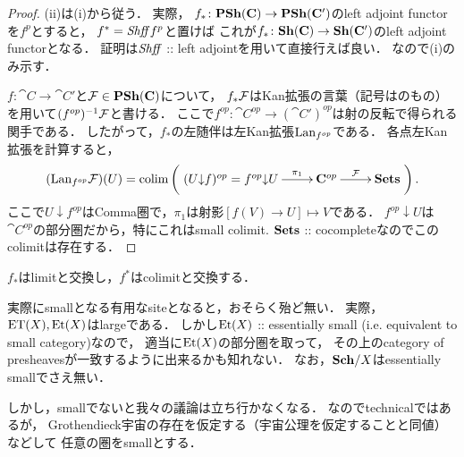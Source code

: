 \documentclass[a4paper]{jsarticle}
\begin{document}
\begin{proof}
    (ii)は(i)から従う．
    実際，
    $f_* \colon \mathbf{PSh}(\mathbf{C}) \to \mathbf{PSh}(\mathbf{C}')$のleft adjoint functorを$f^p$とすると，
    $f^*=\mathit{Shff} f^p$と置けば
    これが$f_* \colon \mathbf{Sh}(\mathbf{C}) \to \mathbf{Sh}(\mathbf{C}')$のleft adjoint functorとなる．
    証明は$\mathit{Shff}$ :: left adjointを用いて直接行えば良い．
    なので(i)のみ示す．

    $f \colon \cat{C} \to \cat{C}'$と$\mathcal{F} \in \mathbf{PSh}(\mathbf{C})$について，
    $f_* \mathcal{F}$はKan拡張の言葉（記号は\cite{CWM}のもの）を用いて$(f^{op})^{-1} \mathcal{F}$と書ける．
    ここで$f^{op} \colon \cat{C}^{op} \to (\cat{C}')^{op}$は射の反転で得られる関手である．
    したがって，$f_*$の左随伴は左Kan拡張$\mathrm{Lan}_{f^{op}}$である．
    各点左Kan拡張を計算すると，
    \[ (\Lan_{f^{op}}\shF)(U)=\Colim\left(\xymatrix{
        (\Comma{U}{f})^{op}=\Comma{f^{op}}{U} \ar[r]^-{\pi_1}& \cat{C}^{op} \ar[r]^-{\shF}& \Sets
    }\right). \]
    ここで$U \downarrow f^{op}$はComma圏で，$\pi_1$は射影$[f(V) \to U] \mapsto V$である．
    $f^{op} \downarrow U$は$\cat{C}^{op}$の部分圏だから，特にこれはsmall colimit.
    $\mathbf{Sets}$ :: cocompleteなのでこのcolimitは存在する．
\end{proof}

\begin{Cor}
    $f_*$はlimitと交換し，$f^*$はcolimitと交換する．
\end{Cor}


\begin{Remark}
    実際にsmallとなる有用なsiteとなると，おそらく殆ど無い．
    実際，$\mathrm{ET}(X), \mathrm{Et}(X)$はlargeである．
    しかし$\mathrm{Et}(X)$ :: essentially small (i.e. equivalent to small category)なので，
    適当に$\mathrm{Et}(X)$の部分圏を取って，
    その上のcategory of presheavesが一致するように出来るかも知れない．
    なお，$\mathbf{Sch}/X$はessentially smallでさえ無い．

    しかし，smallでないと我々の議論は立ち行かなくなる．
    なのでtechnicalではあるが，
    Grothendieck宇宙の存在を仮定する（宇宙公理を仮定することと同値）などして
    任意の圏をsmallとする．
\end{Remark}



\end{document}
